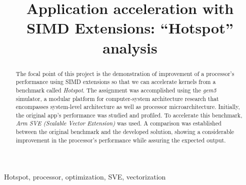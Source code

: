\documentclass[conference]{IEEEtran}
\begin{document}
\title{Application acceleration with SIMD Extensions: ``Hotspot'' analysis\\
}

\author{
    \and
    \and
}

\maketitle

\begin{abstract}
The focal point of this project is the demonstration of improvement of a processor's performance using SIMD extensions so that we can accelerate kernels from a benchmark called \textit{Hotspot}. The assignment was accomplished using the \textit{gem5} simulator, a modular platform for computer-system architecture research that encompasses system-level architecture as well as processor microarchitecture. Initially, the original app's performance was studied and profiled. To accelerate this benchmark, \textit{Arm SVE (Scalable Vector Extension)} was used. A comparison was established between the original benchmark and the developed solution, showing a considerable improvement in the processor's performance while assuring the expected output.
\end{abstract}

\begin{IEEEkeywords}
Hotspot, processor, optimization, SVE, vectorization
\end{IEEEkeywords}
\end{document}

